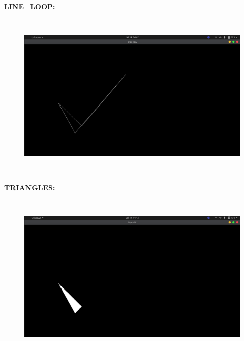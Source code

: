 \documentclass[12pt,letterpaper]{article}
\begin{document}
\newpage
\textbf{LINE\_LOOP:}

\textbf{}
\begin{figure}[h]
    \centering
    \includegraphics[height=8cm, keepaspectratio]{Basics/Outputs/Line_loop.png}
\end{figure}

\newpage
\textbf{TRIANGLES:}

\textbf{}
\begin{figure}[h]
    \centering
    \includegraphics[height=8cm, keepaspectratio]{Basics/Outputs/Triangle.png}
\end{figure}
\end{document}
